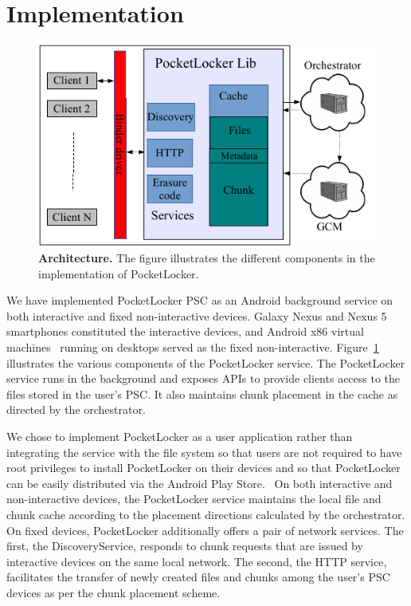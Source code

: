 
\section{Implementation}
\label{sec-implementation}

\begin{figure}[t]

\includegraphics[width=\columnwidth]{./figures/implementation.pdf}

\caption{\small \textbf{Architecture.} The figure illustrates the different
  components in the implementation of PocketLocker.}

\label{fig-implementation}

\end{figure}

We have implemented PocketLocker PSC as an Android background service on both
interactive and fixed non-interactive devices. Galaxy Nexus and Nexus 5
smartphones constituted the interactive devices, and Android x86 virtual
machines~\cite{androidx86} running on desktops served as the fixed
non-interactive. Figure~\ref{fig-implementation}
illustrates the various components of the PocketLocker service. 
The PocketLocker service runs in the background and exposes APIs to provide
clients access to the files stored in the user's PSC. It also maintains chunk
placement in the cache as directed by the orchestrator. 

We chose to implement PocketLocker as a user application rather than
integrating the service with the file system so that users are not required
to have root privileges to install PocketLocker on their devices and so that
PocketLocker can be easily distributed via the Android Play Store.~\cite{playstore} On both
interactive and non-interactive devices, the PocketLocker service maintains
the local file and chunk cache according to the placement directions
calculated by the orchestrator. On fixed devices, PocketLocker additionally
offers a pair of network services.  The first, the DiscoveryService, responds
to chunk requests that are issued by interactive devices on the same local
network. The second, the HTTP service, facilitates the transfer of newly
created files and chunks among the user's PSC devices as per the chunk
placement scheme.


